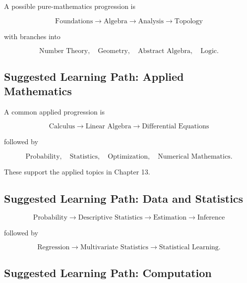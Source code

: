 A possible pure-mathematics progression is

\[
\boxed{
\text{Foundations}
\rightarrow
\text{Algebra}
\rightarrow
\text{Analysis}
\rightarrow
\text{Topology}
}
\]

with branches into

\[
\boxed{
\text{Number Theory},
\quad
\text{Geometry},
\quad
\text{Abstract Algebra},
\quad
\text{Logic}.
}
\]

\subsection{Suggested Learning Path: Applied Mathematics}
\label{subsec:index-learning-path-applied}

A common applied progression is

\[
\boxed{
\text{Calculus}
\rightarrow
\text{Linear Algebra}
\rightarrow
\text{Differential Equations}
}
\]

followed by

\[
\boxed{
\text{Probability},
\quad
\text{Statistics},
\quad
\text{Optimization},
\quad
\text{Numerical Mathematics}.
}
\]

These support the applied topics in Chapter 13.

\subsection{Suggested Learning Path: Data and Statistics}
\label{subsec:index-learning-path-statistics}

\[
\boxed{
\text{Probability}
\rightarrow
\text{Descriptive Statistics}
\rightarrow
\text{Estimation}
\rightarrow
\text{Inference}
}
\]

followed by

\[
\boxed{
\text{Regression}
\rightarrow
\text{Multivariate Statistics}
\rightarrow
\text{Statistical Learning}.
}
\]

\subsection{Suggested Learning Path: Computation}
\label{subsec:index-learning-path-computation}

